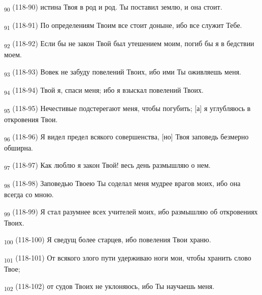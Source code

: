 \begin{tcolorbox}
\textsubscript{90} (118-90) истина Твоя в род и род. Ты поставил землю, и она стоит.
\end{tcolorbox}
\begin{tcolorbox}
\textsubscript{91} (118-91) По определениям Твоим все стоит доныне, ибо все служит Тебе.
\end{tcolorbox}
\begin{tcolorbox}
\textsubscript{92} (118-92) Если бы не закон Твой был утешением моим, погиб бы я в бедствии моем.
\end{tcolorbox}
\begin{tcolorbox}
\textsubscript{93} (118-93) Вовек не забуду повелений Твоих, ибо ими Ты оживляешь меня.
\end{tcolorbox}
\begin{tcolorbox}
\textsubscript{94} (118-94) Твой я, спаси меня; ибо я взыскал повелений Твоих.
\end{tcolorbox}
\begin{tcolorbox}
\textsubscript{95} (118-95) Нечестивые подстерегают меня, чтобы погубить; [а] я углубляюсь в откровения Твои.
\end{tcolorbox}
\begin{tcolorbox}
\textsubscript{96} (118-96) Я видел предел всякого совершенства, [но] Твоя заповедь безмерно обширна.
\end{tcolorbox}
\begin{tcolorbox}
\textsubscript{97} (118-97) Как люблю я закон Твой! весь день размышляю о нем.
\end{tcolorbox}
\begin{tcolorbox}
\textsubscript{98} (118-98) Заповедью Твоею Ты соделал меня мудрее врагов моих, ибо она всегда со мною.
\end{tcolorbox}
\begin{tcolorbox}
\textsubscript{99} (118-99) Я стал разумнее всех учителей моих, ибо размышляю об откровениях Твоих.
\end{tcolorbox}
\begin{tcolorbox}
\textsubscript{100} (118-100) Я сведущ более старцев, ибо повеления Твои храню.
\end{tcolorbox}
\begin{tcolorbox}
\textsubscript{101} (118-101) От всякого злого пути удерживаю ноги мои, чтобы хранить слово Твое;
\end{tcolorbox}
\begin{tcolorbox}
\textsubscript{102} (118-102) от судов Твоих не уклоняюсь, ибо Ты научаешь меня.
\end{tcolorbox}
